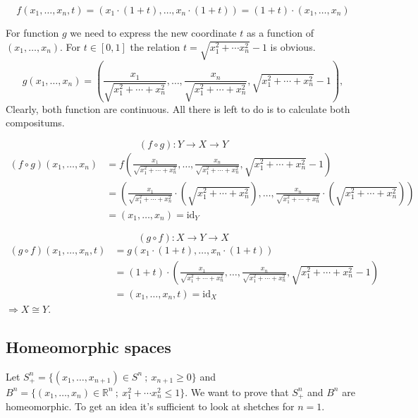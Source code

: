 \documentclass[a4paper,11pt]{article}
\begin{document}
$$ f(x_1, \ldots, x_n, t) =  \left( x_1 \cdot (1 + t), \ldots, x_n \cdot (1 + t) \right) = (1 + t) \cdot (x_1, \ldots, x_n) $$

\noindent
For function $g$ we need to express the new coordinate $t$ as a function of $(x_1, \ldots, x_n)$. For $t \in [0, 1]$ the relation $t = \sqrt{x_1^2 + \cdots x_n^2} - 1 $ is obvious. 
$$ g(x_1, \ldots, x_n) = \left( \frac{x_1}{ \sqrt{x_1^2 + \cdots + x_n^2}}, \ldots, \frac{x_n}{ \sqrt{x_1^2 + \cdots + x_n^2}}, \sqrt{x_1^2 + \cdots + x_n^2} - 1 \right), $$ 
\noindent
Clearly, both function are continuous. 
All there is left to do is to calculate both compositums.

$$ (f \circ g): Y \to X \to Y $$
\begin{align*} 
    (f \circ g)(x_1, \ldots, x_n) &= f \left( \frac{x_1}{ \sqrt{x_1^2 + \cdots + x_n^2}}, \ldots, \frac{x_n}{ \sqrt{x_1^2 + \cdots + x_n^2}}, \sqrt{x_1^2 + \cdots + x_n^2} - 1 \right) \\
    &= \left( \frac{x_1}{ \sqrt{x_1^2 + \cdots + x_n^2}} \cdot \left( \sqrt{x_1^2 + \cdots + x_n^2} \right), \ldots, \frac{x_n}{ \sqrt{x_1^2 + \cdots + x_n^2}} \cdot \left( \sqrt{x_1^2 + \cdots + x_n^2} \right) \right) \\
    &= (x_1, \ldots, x_n) = \text{id}_Y
\end{align*}

$$ (g \circ f): X \to Y \to X$$
\begin{align*} 
    (g \circ f)(x_1, \ldots, x_n, t) &= g \left( x_1 \cdot (1 + t), \ldots, x_n \cdot (1 + t) \right) \\
    &= (1 + t) \cdot \left( \frac{x_1}{ \sqrt{x_1^2 + \cdots + x_n^2}}, \ldots, \frac{x_n}{ \sqrt{x_1^2 + \cdots + x_n^2}}, \sqrt{x_1^2 + \cdots + x_n^2} - 1 \right) \\
    &= (x_1, \ldots, x_n, t) = \text{id}_X
\end{align*}
\noindent 
$ \Longrightarrow X \cong Y $.

\subsection{Homeomorphic spaces}

Let $S_{+}^{n} = \{ (x_1, \ldots , x_{n+1}) \in S^n \ ; \ x_{n + 1} \geq 0\}$ and $B^n = \{ (x_1, \ldots, x_n) \in \mathbb{R}^n \ ; \ x_1^2 + \cdots x_n^2 \leq 1\}$. We want to prove that $S_{+}^{n}$ and $B^n$ are homeomorphic.
To get an idea it's sufficient to look at shetches for $n = 1$.
\end{document}
